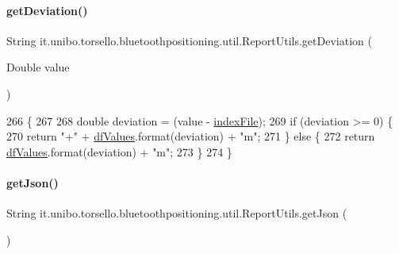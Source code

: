 \paragraph{\texorpdfstring{get\+Deviation()}{getDeviation()}}
{\footnotesize\ttfamily String it.\+unibo.\+torsello.\+bluetoothpositioning.\+util.\+Report\+Utils.\+get\+Deviation (\begin{DoxyParamCaption}\item[{Double}]{value }\end{DoxyParamCaption})\hspace{0.3cm}{\ttfamily [private]}}


\begin{DoxyCode}
266                                               \{
267 
268         \textcolor{keywordtype}{double} deviation = (value - \hyperlink{classit_1_1unibo_1_1torsello_1_1bluetoothpositioning_1_1util_1_1ReportUtils_afcda83ce8a192e352a399e5454fcbba6_afcda83ce8a192e352a399e5454fcbba6}{indexFile});
269         \textcolor{keywordflow}{if} (deviation >= 0) \{
270             \textcolor{keywordflow}{return} \textcolor{stringliteral}{"+"} + \hyperlink{classit_1_1unibo_1_1torsello_1_1bluetoothpositioning_1_1util_1_1ReportUtils_afb07df801c89068760b260fb09916895_afb07df801c89068760b260fb09916895}{dfValues}.format(deviation) + \textcolor{stringliteral}{"m"};
271         \} \textcolor{keywordflow}{else} \{
272             \textcolor{keywordflow}{return} \hyperlink{classit_1_1unibo_1_1torsello_1_1bluetoothpositioning_1_1util_1_1ReportUtils_afb07df801c89068760b260fb09916895_afb07df801c89068760b260fb09916895}{dfValues}.format(deviation) + \textcolor{stringliteral}{"m"};
273         \}
274     \}
\end{DoxyCode}
\hypertarget{classit_1_1unibo_1_1torsello_1_1bluetoothpositioning_1_1util_1_1ReportUtils_a768356af2517bb604a39daf2497fc761_a768356af2517bb604a39daf2497fc761}{}\label{classit_1_1unibo_1_1torsello_1_1bluetoothpositioning_1_1util_1_1ReportUtils_a768356af2517bb604a39daf2497fc761_a768356af2517bb604a39daf2497fc761} 
\paragraph{\texorpdfstring{get\+Json()}{getJson()}}
{\footnotesize\ttfamily String it.\+unibo.\+torsello.\+bluetoothpositioning.\+util.\+Report\+Utils.\+get\+Json (\begin{DoxyParamCaption}{ }\end{DoxyParamCaption})}



